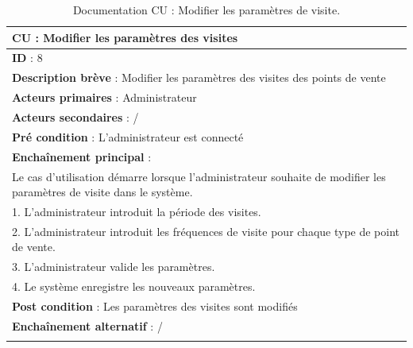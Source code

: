 \renewcommand{\arraystretch}{1.5}
\begin{xltabular}{\linewidth}{|X|}
    \hline
    \textbf{CU} : Modifier les paramètres des visites    \\\hline
    \textbf{ID} :  8   \\\hline
    \textbf{Description brève} : Modifier les paramètres des visites des points de vente      \\\hline
    \textbf{Acteurs primaires} :  Administrateur    \\\hline
    \textbf{Acteurs secondaires} :  /    \\\hline
    \textbf{Pré condition} : L'administrateur est connecté     \\\hline
    \textbf{Enchaînement principal} : \\
    Le cas d'utilisation démarre lorsque l'administrateur souhaite de modifier les paramètres de visite dans le système. \\
    1. L'administrateur introduit la période des visites. \\
    2. L'administrateur introduit les fréquences de visite pour chaque type de point de vente. \\
    3. L'administrateur valide les paramètres.\\
    4. Le système enregistre les nouveaux paramètres.
    \\\hline
    \textbf{Post condition} : Les paramètres des visites sont modifiés     \\\hline
    \textbf{Enchaînement alternatif} :   /   \\\hline
    
    \caption{Documentation CU : Modifier les paramètres de visite.}
    \label{tab:cu-specs3}
\end{xltabular}
\FloatBarrier


